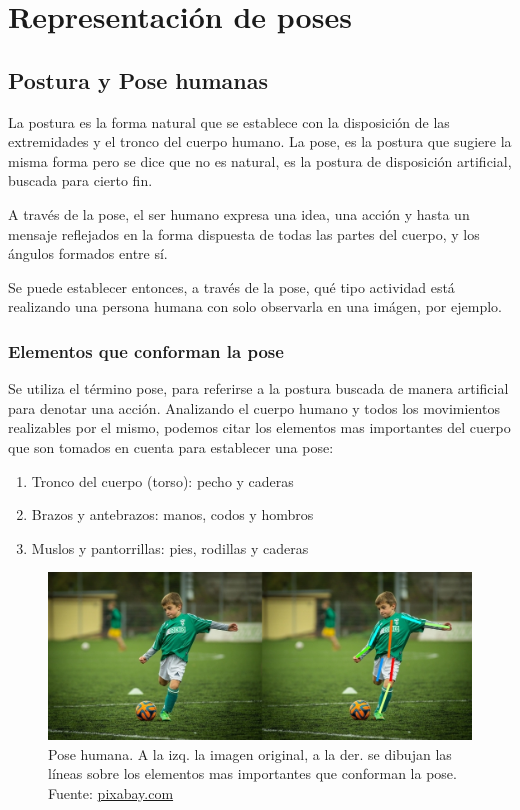 \documentclass[a4paper,12pt,oneside,spanish]{book}
\begin{document}
\newpage
\chapter{Representación de poses}
\section{Postura y Pose humanas}

La postura es la forma natural que se establece con la disposición de las extremidades y el tronco del cuerpo humano. La pose, es la postura que sugiere la misma forma pero se dice que no es natural, es la postura de disposición artificial, buscada para cierto fin. \par

A través de la pose, el ser humano expresa una idea, una acción y hasta un mensaje reflejados en la forma dispuesta de todas las partes del cuerpo, y los ángulos formados entre sí. \par

Se puede establecer entonces, a través de la pose, qué tipo actividad está realizando una persona humana con solo observarla en una imágen, por ejemplo. \par

\subsection{Elementos que conforman la pose}
Se utiliza el término pose, para referirse a la postura buscada de manera artificial para denotar una acción. Analizando el cuerpo humano y todos los movimientos realizables por el mismo, podemos citar los elementos mas importantes del cuerpo que son tomados en cuenta para establecer una pose: 
\begin{enumerate}
	\baselineskip 16pt
	\item Tronco del cuerpo (torso): pecho y caderas  
	\item Brazos y antebrazos: manos, codos y hombros  
	\item Muslos y pantorrillas: pies, rodillas y caderas
\end{enumerate}	\baselineskip 16pt

\begin{figure}[h!]
	\includegraphics[width=350pt]{Imagenes/pose1.jpg}
	\centering
	\caption{Pose humana. A la izq. la imagen original, a la der. se dibujan las líneas sobre los elementos mas importantes que conforman la pose. Fuente: \url{pixabay.com}}
	\label{fig:pose1}
\end{figure}
\end{document}
